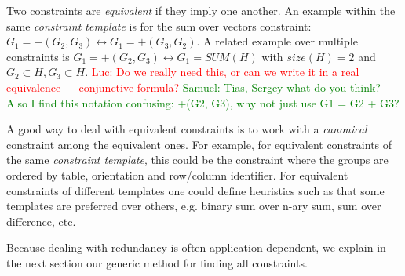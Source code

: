 \documentclass{sig-alternate-05-2015}
\newcommand{\samuel}[1]{\textcolor{green}{{\sc Samuel:} #1}\xspace}
\newcommand{\tias}[1]{\textcolor{blue}{{\sc Tias:} #1}\xspace}
\newcommand{\luc}[1]{\textcolor{red}{{\sc Luc:} #1}\xspace}
\newcommand{\format}[1]{\textit{#1}\xspace}
\newcommand{\template}{\format{constraint template}}
\newcommand{\dependencies}{\ensuremath{\mathcal{D}}\xspace}
\begin{document}
Two constraints are \textit{equivalent} if they imply one another. %
An example within the same \template is for the sum over vectors constraint: $G_1 = +(G_2, G_3) \leftrightarrow G_1 = +(G_3, G_2)$. A related example over multiple constraints is $G_1 = +(G_2, G_3) \leftrightarrow G_1 = \textit{SUM}(H)$ with $\textit{size}(H) = 2$ and $G_2 \subset H, G_3 \subset H$.
\luc{Do we really need this, or can we write it in a real equivalence --- conjunctive formula?}
\samuel{Tias, Sergey what do you think? Also I find this notation confusing: +(G2, G3), why not just use G1 = G2 + G3?}

A good way to deal with equivalent constraints is to work with a \textit{canonical} constraint among the equivalent ones. For example, for equivalent constraints of the same \template, this could be the constraint where the groups are ordered by table, orientation and row/column identifier. For equivalent constraints of different templates one could define heuristics such as that some templates are preferred over others, e.g. binary sum over n-ary sum, sum over difference, etc.

Because dealing with redundancy is often application-dependent, we explain in the next section our generic method for finding all constraints.


%
\end{document}
